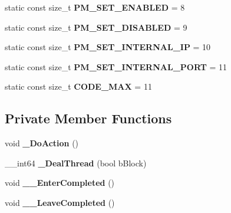 \begin{DoxyCompactItemize}
\item 
\hypertarget{classcl_u_pn_p_thread_a6aec2bc672148dd903887b90ef25d440}{
static const size\_\-t {\bfseries PM\_\-SET\_\-ENABLED} = 8}
\label{classcl_u_pn_p_thread_a6aec2bc672148dd903887b90ef25d440}

\item 
\hypertarget{classcl_u_pn_p_thread_a6291a1d16ace84f15249becc53b772e3}{
static const size\_\-t {\bfseries PM\_\-SET\_\-DISABLED} = 9}
\label{classcl_u_pn_p_thread_a6291a1d16ace84f15249becc53b772e3}

\item 
\hypertarget{classcl_u_pn_p_thread_a341b3664c57fdf72cd88c790845e5848}{
static const size\_\-t {\bfseries PM\_\-SET\_\-INTERNAL\_\-IP} = 10}
\label{classcl_u_pn_p_thread_a341b3664c57fdf72cd88c790845e5848}

\item 
\hypertarget{classcl_u_pn_p_thread_afe68ba84a2d1b5139a35fb808163a858}{
static const size\_\-t {\bfseries PM\_\-SET\_\-INTERNAL\_\-PORT} = 11}
\label{classcl_u_pn_p_thread_afe68ba84a2d1b5139a35fb808163a858}

\item 
\hypertarget{classcl_u_pn_p_thread_a8713f2bf0e493d60f239d0db9fb2b12a}{
static const size\_\-t {\bfseries CODE\_\-MAX} = 11}
\label{classcl_u_pn_p_thread_a8713f2bf0e493d60f239d0db9fb2b12a}

\end{DoxyCompactItemize}
\subsection*{Private Member Functions}
\begin{DoxyCompactItemize}
\item 
\hypertarget{classcl_u_pn_p_thread_a6a8cc538a98fec848061792ac1369bae}{
void {\bfseries \_\-DoAction} ()}
\label{classcl_u_pn_p_thread_a6a8cc538a98fec848061792ac1369bae}

\item 
\hypertarget{classcl_u_pn_p_thread_ab432160d003a762c1ecc78004351da5d}{
\_\-\_\-int64 {\bfseries \_\-DealThread} (bool bBlock)}
\label{classcl_u_pn_p_thread_ab432160d003a762c1ecc78004351da5d}

\item 
\hypertarget{classcl_u_pn_p_thread_a46195fa44a19065b724e466602bf70ce}{
void {\bfseries \_\-\_\-EnterCompleted} ()}
\label{classcl_u_pn_p_thread_a46195fa44a19065b724e466602bf70ce}

\item 
\hypertarget{classcl_u_pn_p_thread_af3389759419f21131eb07899dfd4e7ea}{
void {\bfseries \_\-\_\-LeaveCompleted} ()}
\label{classcl_u_pn_p_thread_af3389759419f21131eb07899dfd4e7ea}

\end{DoxyCompactItemize}
